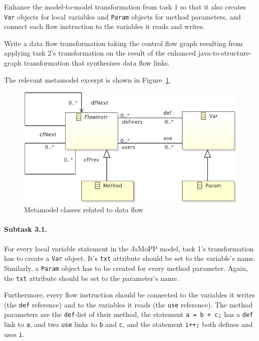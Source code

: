 \documentclass[11pt]{article}
\begin{document}
\begin{compactenum}
\item Enhance the model-to-model transformation from task 1 so that it also
  creates \verb|Var| objects for local variables and \verb|Param| objects for
  method parameters, and connect each flow instruction to the variables it
  reads and writes.
\item Write a data flow transformation taking the control flow graph resulting
  from applying task 2's transformation on the result of the enhanced
  java-to-structure-graph transformation that synthesizes data flow links.
\end{compactenum}

The relevant metamodel excerpt is shown in Figure~\ref{fig:data-flow-mm}.

\begin{figure}[h!]
  \centering
  \includegraphics[width=0.6\linewidth]{../metamodel/DataFlowGraph}
  \caption{Metamodel classes related to data flow}
  \label{fig:data-flow-mm}
\end{figure}

\paragraph{Subtask 3.1.}
\label{sec:subtask-3.1}

For every local variable statement in the JaMoPP model, task 1's transformation
has to create a \verb|Var| object.  It's \verb|txt| attribute should be set to
the variable's name.  Similarly, a \verb|Param| object has to be created for
every method parameter.  Again, the \verb|txt| attribute should be set to the
parameter's name.

Furthermore, every flow instruction should be connected to the variables it
writes (the \verb|def| reference) and to the variables it reads (the \verb|use|
reference).  The method parameters are the \verb|def|-list of their method, the
statement \verb|a = b + c;| has a \verb|def| link to \verb|a|, and two
\verb|use| links to \verb|b| and \verb|c|, and the statement \verb|i++;| both
defines and uses \verb|i|.
\end{document}
